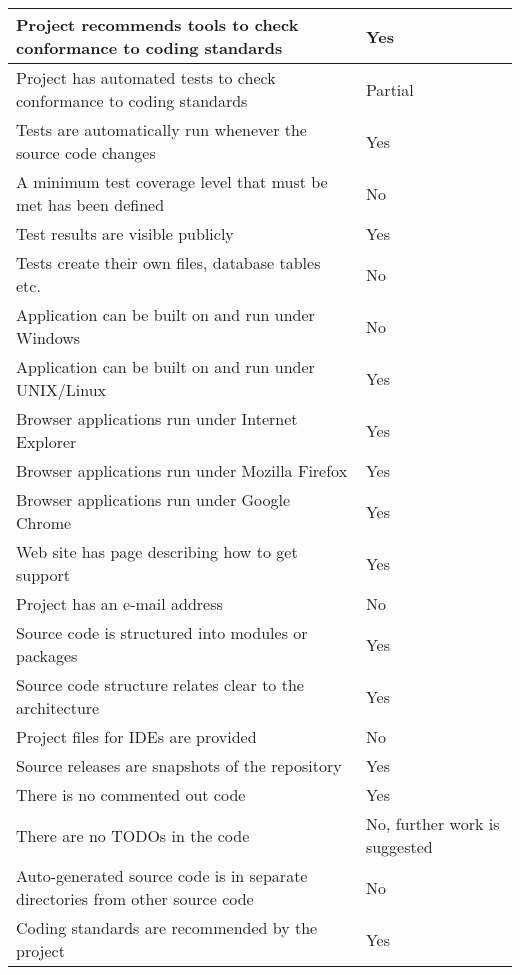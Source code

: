 \begin{center}
\begin{longtable}{ | L{11cm} | L{4cm} | }
Project recommends tools to check conformance to coding standards & Yes\\\hline
Project has automated tests to check conformance to coding standards & Partial\\\hline
Tests are automatically run whenever the source code changes & Yes\\\hline
A minimum test coverage level that must be met has been defined & No\\\hline
Test results are visible publicly & Yes\\\hline
Tests create their own files, database tables etc. & No\\\hline
Application can be built on and run under Windows & No\\\hline
Application can be built on and run under UNIX/Linux & Yes\\\hline
Browser applications run under Internet Explorer & Yes\\\hline
Browser applications run under Mozilla Firefox & Yes\\\hline
Browser applications run under Google Chrome & Yes\\\hline
Web site has page describing how to get support & Yes\\\hline
Project has an e-mail address & No\\\hline
Source code is structured into modules or packages & Yes\\\hline
Source code structure relates clear to the architecture & Yes\\\hline
Project files for IDEs are provided & No\\\hline
Source releases are snapshots of the repository & Yes\\\hline
There is no commented out code & Yes\\\hline
There are no TODOs in the code & No, further work is suggested\\\hline
Auto-generated source code is in separate directories from other source code & No\\\hline
Coding standards are recommended by the project & Yes\\\hline
\end{longtable}
\end{center}